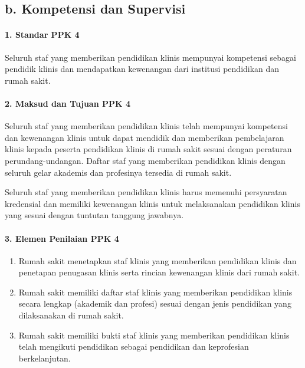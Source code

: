 \documentclass[
]{book}
\providecommand{\tightlist}{%
  \setlength{\itemsep}{0pt}\setlength{\parskip}{0pt}}
\begin{document}
\hypertarget{b.-kompetensi-dan-supervisi}{%
\subsection*{b. Kompetensi dan Supervisi}\label{b.-kompetensi-dan-supervisi}}

\hypertarget{standar-ppk-4}{%
\paragraph*{1. Standar PPK 4}\label{standar-ppk-4}}

Seluruh staf yang memberikan pendidikan klinis mempunyai kompetensi sebagai pendidik klinis dan mendapatkan kewenangan dari institusi pendidikan dan rumah sakit.

\hypertarget{maksud-dan-tujuan-ppk-4}{%
\paragraph*{2. Maksud dan Tujuan PPK 4}\label{maksud-dan-tujuan-ppk-4}}

Seluruh staf yang memberikan pendidikan klinis telah mempunyai kompetensi dan kewenangan klinis untuk dapat mendidik dan memberikan pembelajaran klinis kepada peserta pendidikan klinis di rumah sakit sesuai dengan peraturan perundang-undangan. Daftar staf yang memberikan pendidikan klinis dengan seluruh gelar akademis dan profesinya tersedia di rumah sakit.

Seluruh staf yang memberikan pendidikan klinis harus memenuhi persyaratan kredensial dan memiliki kewenangan klinis untuk melaksanakan pendidikan klinis yang sesuai dengan tuntutan tanggung jawabnya.

\hypertarget{elemen-penilaian-ppk-4}{%
\paragraph*{3. Elemen Penilaian PPK 4}\label{elemen-penilaian-ppk-4}}

\begin{enumerate}
\def\labelenumi{\alph{enumi}.}
\tightlist
\item
  Rumah sakit menetapkan staf klinis yang memberikan pendidikan klinis dan penetapan penugasan klinis serta rincian kewenangan klinis dari rumah sakit.
\item
  Rumah sakit memiliki daftar staf klinis yang memberikan pendidikan klinis secara lengkap (akademik dan profesi) sesuai dengan jenis pendidikan yang dilaksanakan di rumah sakit.
\item
  Rumah sakit memiliki bukti staf klinis yang memberikan pendidikan klinis telah mengikuti pendidikan sebagai pendidikan dan keprofesian berkelanjutan.
\end{enumerate}
\end{document}
